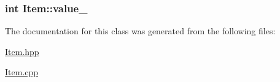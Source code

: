 \hypertarget{classItem_aab4eafdc2cc91135a58cd5451af637b3}{
\subsubsection[{value\-\_\-}]{\setlength{\rightskip}{0pt plus 5cm}int Item\-::value\-\_\-\hspace{0.3cm}{\ttfamily [protected]}}}\label{classItem_aab4eafdc2cc91135a58cd5451af637b3}


The documentation for this class was generated from the following files\-:\begin{DoxyCompactItemize}
\item 
\hyperlink{Item_8hpp}{Item.\-hpp}\item 
\hyperlink{Item_8cpp}{Item.\-cpp}\end{DoxyCompactItemize}
